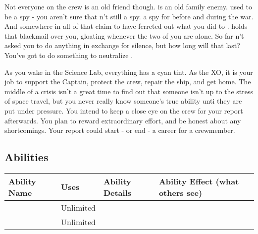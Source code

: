 \documentclass[char]{TMFHope}
\begin{document}
Not everyone on the crew is an old friend though. \cDip{} is an old family enemy. \cDip{\They} used to be a spy - you aren't sure that \cDip{\they} \cDip{\are}n't still a spy. \cDip{\They} \cDip{\were} a spy for \pPlan{} before and during the war. And somewhere in all of that \cDip{\they} claim\cDip{\plural} to have ferreted out what you did to \cCap{}. \cDip{} holds that blackmail over you, gloating whenever the two of you are alone. So far \cDip{\they} \cDip{\have}n't asked you to do anything in exchange for \cDip{\their} silence, but how long will that last? You've got to do something to neutralize \cDip{\them}.

As you wake in the Science Lab, everything has a cyan tint.  As the XO, it is your job to support the Captain, protect the crew, repair the ship, and get home. The middle of a crisis isn't a great time to find out that someone isn't up to the stress of space travel, but you never really know someone's true ability unti they are put under pressure. You intend to keep a close eye on the crew for your report afterwards. You plan to reward extraordinary effort, and be honest about any shortcomings. Your report could start - or end - a career for a crewmember.

\subsection*{Abilities}
\begin{tabular}{|p{3cm}|p{1.5cm}|p{8cm}|p{3.5cm}|} 
 \hline
 \textbf{Ability Name} & \textbf{Uses} & \textbf{Ability Details} & \textbf{Ability Effect (what others see)} \\ 
\hline 
\aThreat{\MYname} & Unlimited & \aThreat{\MYtext} & \aThreat{\MYeffect} \\ 
\hline 
\aCalculate{\MYname} & Unlimited & \aCalculate{\MYtext} & \aCalculate{\MYeffect}\\ 
 \hline
\end{tabular}
\end{document}
